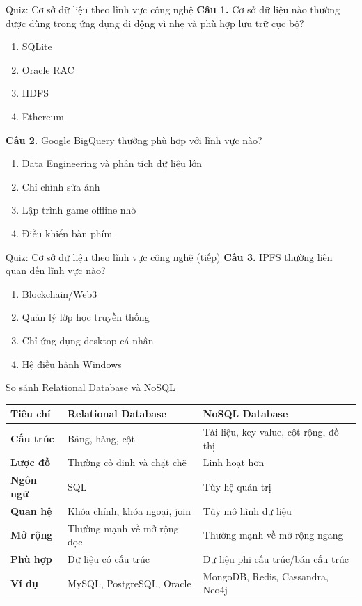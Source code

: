 ﻿\documentclass[aspectratio=169,11pt]{beamer}
\newcommand{\tightlist}{\setlength{\itemsep}{2pt}\setlength{\parskip}{0pt}}
\newcommand{\qoption}[2]{\item[#1.] #2}
\begin{document}
\begin{frame}{Quiz: Cơ sở dữ liệu theo lĩnh vực công nghệ}
\small
\textbf{Câu 1.} Cơ sở dữ liệu nào thường được dùng trong ứng dụng di động vì nhẹ và phù hợp lưu trữ cục bộ?
\begin{enumerate}
\tightlist
  \qoption{A}{SQLite}
  \qoption{B}{Oracle RAC}
  \qoption{C}{HDFS}
  \qoption{D}{Ethereum}
\end{enumerate}

\textbf{Câu 2.} Google BigQuery thường phù hợp với lĩnh vực nào?
\begin{enumerate}
\tightlist
  \qoption{A}{Data Engineering và phân tích dữ liệu lớn}
  \qoption{B}{Chỉ chỉnh sửa ảnh}
  \qoption{C}{Lập trình game offline nhỏ}
  \qoption{D}{Điều khiển bàn phím}
\end{enumerate}
\end{frame}

\begin{frame}{Quiz: Cơ sở dữ liệu theo lĩnh vực công nghệ (tiếp)}
\small
\textbf{Câu 3.} IPFS thường liên quan đến lĩnh vực nào?
\begin{enumerate}
\tightlist
  \qoption{A}{Blockchain/Web3}
  \qoption{B}{Quản lý lớp học truyền thống}
  \qoption{C}{Chỉ ứng dụng desktop cá nhân}
  \qoption{D}{Hệ điều hành Windows}
\end{enumerate}
\end{frame}

\begin{frame}{So sánh Relational Database và NoSQL}
\scriptsize
\begin{tabularx}{\textwidth}{>{\bfseries}p{} X X}
\toprule
Tiêu chí & Relational Database & NoSQL Database \\
\midrule
Cấu trúc & Bảng, hàng, cột & Tài liệu, key-value, cột rộng, đồ thị \\
Lược đồ & Thường cố định và chặt chẽ & Linh hoạt hơn \\
Ngôn ngữ & SQL & Tùy hệ quản trị \\
Quan hệ & Khóa chính, khóa ngoại, join & Tùy mô hình dữ liệu \\
Mở rộng & Thường mạnh về mở rộng dọc & Thường mạnh về mở rộng ngang \\
Phù hợp & Dữ liệu có cấu trúc & Dữ liệu phi cấu trúc/bán cấu trúc \\
Ví dụ & MySQL, PostgreSQL, Oracle & MongoDB, Redis, Cassandra, Neo4j \\
\bottomrule
\end{tabularx}
\end{frame}
\end{document}
